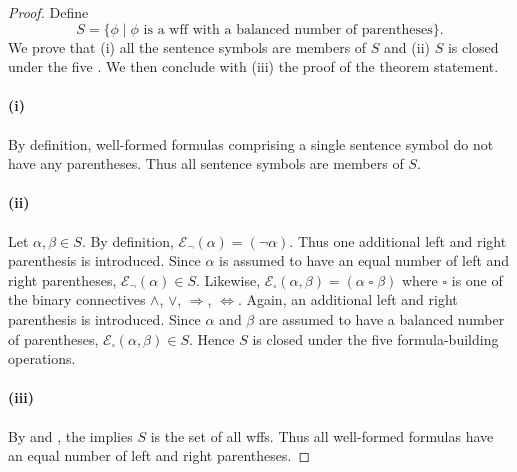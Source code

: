 \documentclass{report}
\begin{document}
  \begin{proof}

    Define $$S = \{ \phi \mid
      \phi \text{ is a wff with a balanced number of parentheses} \}.$$
    We prove that (i) all the sentence symbols are members of $S$ and (ii)
      $S$ is closed under the five .
    We then conclude with (iii) the proof of the theorem statement.

    \paragraph{(i)}%

      By definition, well-formed formulas comprising a single sentence symbol
        do not have any parentheses.
      Thus all sentence symbols are members of $S$.

    \paragraph{(ii)}%

      Let $\alpha, \beta \in S$.
      By definition, $\mathcal{E}_{\neg}(\alpha) = (\neg\alpha)$.
      Thus one additional left and right parenthesis is introduced.
      Since $\alpha$ is assumed to have an equal number of left and right
        parentheses, $\mathcal{E}_{\neg}(\alpha) \in S$.
      Likewise,
        $\mathcal{E}_{\square}(\alpha, \beta) = (\alpha \mathop{\square} \beta)$
        where $\square$ is one of the binary connectives $\land$, $\lor$,
          $\Rightarrow$, $\Leftrightarrow$.
      Again, an additional left and right parenthesis is introduced.
      Since $\alpha$ and $\beta$ are assumed to have a balanced number of
        parentheses, $\mathcal{E}_{\square}(\alpha, \beta) \in S$.
      Hence $S$ is closed under the five formula-building operations.

    \paragraph{(iii)}%

      By  and
        , the
         implies $S$ is the set of all wffs.
      Thus all well-formed formulas have an equal number of left and right
        parentheses.

  \end{proof}
\end{document}
